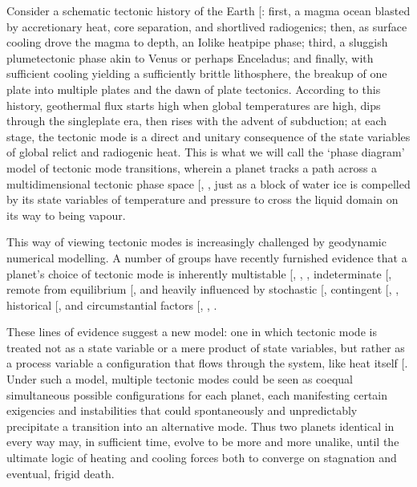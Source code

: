 \documentclass[letterpaper,10pt,english]{jupyterBook}
\begin{document}
\sphinxAtStartPar
Consider a schematic tectonic history of the Earth {[}\sphinxcite{references:id349}{]}: first, a magma ocean blasted by accretionary heat, core separation, and short\sphinxhyphen{}lived radiogenics; then, as surface cooling drove the magma to depth, an Io\sphinxhyphen{}like heat\sphinxhyphen{}pipe phase; third, a sluggish plume\sphinxhyphen{}tectonic phase akin to Venus or perhaps Enceladus; and finally, with sufficient cooling yielding a sufficiently brittle lithosphere, the breakup of one plate into multiple plates and the dawn of plate tectonics. According to this history, geothermal flux starts high when global temperatures are high, dips through the single\sphinxhyphen{}plate era, then rises with the advent of subduction; at each stage, the tectonic mode is a direct and unitary consequence of the state variables of global relict and radiogenic heat. This is what we will call the ‘phase diagram’ model of tectonic mode transitions, wherein a planet tracks a path across a multidimensional tectonic phase space {[}, , \sphinxcite{references:id498}{]} just as a block of water ice is compelled by its state variables of temperature and pressure to cross the liquid domain on its way to being vapour.

\sphinxAtStartPar
This way of viewing tectonic modes is increasingly challenged by geodynamic numerical modelling. A number of groups have recently furnished evidence that a planet’s choice of tectonic mode is inherently multistable {[}, , \sphinxcite{references:id513}{]}, indeterminate {[}\sphinxcite{references:id435}{]}, remote from equilibrium {[}\sphinxcite{references:id513}{]}, and heavily influenced by stochastic {[}\sphinxcite{references:id367}{]}, contingent {[}, \sphinxcite{references:id644}{]}, historical {[}\sphinxcite{references:id96}{]}, and circumstantial factors {[}, , \sphinxcite{references:id346}{]}.

\sphinxAtStartPar
These lines of evidence suggest a new model: one in which tectonic mode is treated not as a state variable or a mere product of state variables, but rather as a process variable \sphinxhyphen{} a configuration that flows through the system, like heat itself {[}\sphinxcite{references:id351}{]}. Under such a model, multiple tectonic modes could be seen as coequal simultaneous possible configurations for each planet, each manifesting certain exigencies and instabilities that could spontaneously and unpredictably precipitate a transition into an alternative mode. Thus two planets identical in every way may, in sufficient time, evolve to be more and more unalike, until the ultimate logic of heating and cooling forces both to converge on stagnation and eventual, frigid death.
\end{document}
